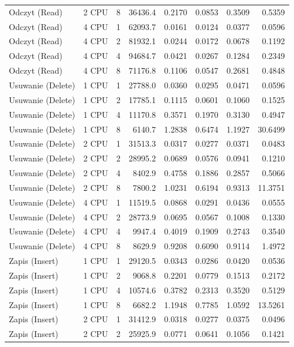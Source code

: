 \begin{table}[ht]
{\begin{tabular}{llcrrrrr}
Odczyt (Read) & 2 CPU & 8 & 36436.4 & 0.2170 & 0.0853 & 0.3509 & 0.5359 \\
Odczyt (Read) & 4 CPU & 1 & 62093.7 & 0.0161 & 0.0124 & 0.0377 & 0.0596 \\
Odczyt (Read) & 4 CPU & 2 & 81932.1 & 0.0244 & 0.0172 & 0.0678 & 0.1192 \\
Odczyt (Read) & 4 CPU & 4 & 94684.7 & 0.0421 & 0.0267 & 0.1284 & 0.2349 \\
Odczyt (Read) & 4 CPU & 8 & 71176.8 & 0.1106 & 0.0547 & 0.2681 & 0.4848 \\
Usuwanie (Delete) & 1 CPU & 1 & 27788.0 & 0.0360 & 0.0295 & 0.0471 & 0.0596 \\
Usuwanie (Delete) & 1 CPU & 2 & 17785.1 & 0.1115 & 0.0601 & 0.1060 & 0.1525 \\
Usuwanie (Delete) & 1 CPU & 4 & 11170.8 & 0.3571 & 0.1970 & 0.3130 & 0.4947 \\
Usuwanie (Delete) & 1 CPU & 8 & 6140.7 & 1.2838 & 0.6474 & 1.1927 & 30.6499 \\
Usuwanie (Delete) & 2 CPU & 1 & 31513.3 & 0.0317 & 0.0277 & 0.0371 & 0.0483 \\
Usuwanie (Delete) & 2 CPU & 2 & 28995.2 & 0.0689 & 0.0576 & 0.0941 & 0.1210 \\
Usuwanie (Delete) & 2 CPU & 4 & 8402.9 & 0.4758 & 0.1886 & 0.2857 & 0.5066 \\
Usuwanie (Delete) & 2 CPU & 8 & 7800.2 & 1.0231 & 0.6194 & 0.9313 & 11.3751 \\
Usuwanie (Delete) & 4 CPU & 1 & 11519.5 & 0.0868 & 0.0291 & 0.0436 & 0.0555 \\
Usuwanie (Delete) & 4 CPU & 2 & 28773.9 & 0.0695 & 0.0567 & 0.1008 & 0.1330 \\
Usuwanie (Delete) & 4 CPU & 4 & 9947.4 & 0.4019 & 0.1909 & 0.2743 & 0.3540 \\
Usuwanie (Delete) & 4 CPU & 8 & 8629.9 & 0.9208 & 0.6090 & 0.9114 & 1.4972 \\
Zapis (Insert) & 1 CPU & 1 & 29120.5 & 0.0343 & 0.0286 & 0.0420 & 0.0536 \\
Zapis (Insert) & 1 CPU & 2 & 9068.8 & 0.2201 & 0.0779 & 0.1513 & 0.2172 \\
Zapis (Insert) & 1 CPU & 4 & 10574.6 & 0.3782 & 0.2313 & 0.3520 & 0.5129 \\
Zapis (Insert) & 1 CPU & 8 & 6682.2 & 1.1948 & 0.7785 & 1.0592 & 13.5261 \\
Zapis (Insert) & 2 CPU & 1 & 31412.9 & 0.0318 & 0.0277 & 0.0375 & 0.0496 \\
Zapis (Insert) & 2 CPU & 2 & 25925.9 & 0.0771 & 0.0641 & 0.1056 & 0.1421 \\

\end{tabular}}
\end{table}
